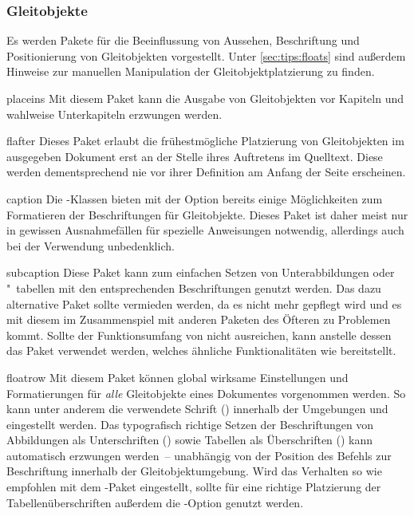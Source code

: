 \subsubsection{Gleitobjekte}
%
Es werden Pakete für die Beeinflussung von Aussehen, Beschriftung und 
Positionierung von Gleitobjekten vorgestellt. Unter \autoref{sec:tips:floats} 
sind außerdem Hinweise zur manuellen Manipulation der Gleitobjektplatzierung zu 
finden.

\begin{packages}
\item[placeins]
  Mit diesem Paket kann die Ausgabe von Gleitobjekten vor Kapiteln und wahlweise
  Unterkapiteln erzwungen werden.
\item[flafter]
  Dieses Paket erlaubt die frühestmögliche Platzierung von Gleitobjekten im 
  ausgegeben Dokument erst an der Stelle ihres Auftretens im Quelltext. Diese 
  werden dementsprechend nie vor ihrer Definition am Anfang der Seite 
  erscheinen.
\item[caption]
  Die \KOMAScript-Klassen bieten mit der Option  bereits 
  einige Möglichkeiten zum Formatieren der Beschriftungen für Gleitobjekte. 
  Dieses Paket ist daher meist nur in gewissen Ausnahmefällen für spezielle 
  Anweisungen notwendig, allerdings auch bei der Verwendung unbedenklich.
\item[subcaption]
  Diese Paket kann zum einfachen Setzen von Unterabbildungen oder "~tabellen 
  mit den entsprechenden Beschriftungen genutzt werden. Das dazu alternative 
  Paket  sollte vermieden werden, da es nicht mehr gepflegt 
  wird und es mit diesem im Zusammenspiel mit anderen Paketen des Öfteren zu 
  Problemen kommt. Sollte der Funktionsumfang von  nicht 
  ausreichen, kann anstelle dessen das Paket  verwendet 
  werden, welches ähnliche Funktionalitäten wie  bereitstellt.
\item[floatrow]
  Mit diesem Paket können global wirksame Einstellungen und Formatierungen für 
  \emph{alle} Gleitobjekte eines Dokumentes vorgenommen werden. So kann unter 
  anderem die verwendete Schrift () 
  innerhalb der Umgebungen  und  
  eingestellt werden. Das typografisch richtige Setzen der Beschriftungen von 
  Abbildungen als Unterschriften 
  ()
  sowie Tabellen als Überschriften 
  ()
  kann automatisch erzwungen werden~-- unabhängig von der Position des Befehls 
  zur Beschriftung  innerhalb der Gleitobjektumgebung. Wird das 
  Verhalten so wie empfohlen mit dem -Paket eingestellt, 
  sollte für eine richtige Platzierung der Tabellenüberschriften außerdem die 
  \KOMAScript-Option  genutzt werden.
%
\end{packages}


